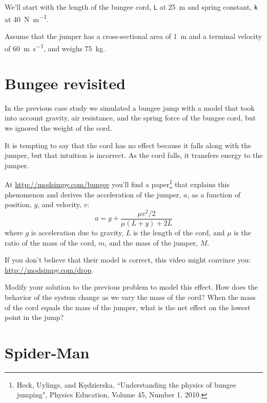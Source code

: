 \documentclass[main.tex]{subfiles}
\begin{document}


We'll start with the length of the bungee cord, {\tt L} at \SI{25}{\meter} and spring constant, {\tt k} at \SI{40}{\newton \per \meter}.

Assume that the jumper has a cross-sectional area of \SI{1}{\meter} and a terminal velocity of \SI{60}{\meter\per\second}, and weighs \SI{75}{\kilogram}.


\section{Bungee revisited}


In the previous case study we simulated a bungee jump with a model that took into account gravity, air resistance, and the spring force of the bungee cord, but we ignored the weight of the cord.


It is tempting to say that the cord has no effect because it falls along with the jumper, but that intuition is incorrect.  As the cord falls, it transfers energy to the jumper.


At \url{http://modsimpy.com/bungee} you'll find a paper\footnote{Heck, Uylings, and Kędzierska, ``Understanding the physics of bungee jumping", Physics Education, Volume 45, Number 1, 2010.} that explains this phenomenon and derives the acceleration of the jumper, $a$, as a function of position, $y$, and velocity, $v$:
%
\[ a = g + \frac{\mu v^2/2}{\mu(L+y) + 2L} \] 
%
where $g$ is acceleration due to gravity, $L$ is the length of the cord, and $\mu$ is the ratio of the mass of the cord, $m$, and the mass of the jumper, $M$.

If you don't believe that their model is correct, this video might convince you: \url{http://modsimpy.com/drop}.

Modify your solution to the previous problem to model this effect.  How does the behavior of the system change as we vary the mass of the cord?  When the mass of the cord equals the mass of the jumper, what is the net effect on the lowest point in the jump?


\section{Spider-Man}
\end{document}
